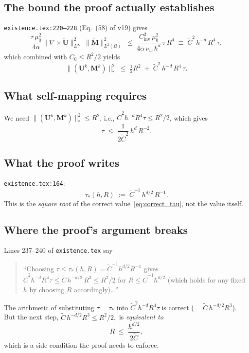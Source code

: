 \documentclass[11pt]{article}
\newcommand{\bM}{\mathbf{M}}
\newcommand{\bU}{\mathbf{U}}
\newcommand{\dt}{\tau}
\newcommand{\Lnorm}[1]{\|#1\|_{L^2(\Omega)}}
\newcommand{\Ctilde}{\widetilde{C}}
\begin{document}
\subsection*{The bound the proof actually establishes}

\texttt{existence.tex:220--228} (Eq.~(58) of v19) gives
\[
\frac{\dt\,\mu_{0}^{2}}{4\alpha}
  \|\nabla\!\times\!\widetilde{\bU}\|_{L^{\infty}}^{2}\,\Lnorm{\widetilde{\bM}}^{2}
\;\le\;
\frac{C_{\mathrm{inv}}^{2}\,\mu_{0}^{2}}{4\alpha\,\nu_{w}\,h^{d}}
\,\dt\,R^{4}
\;\equiv\;\Ctilde^{2}\,h^{-d}\,R^{4}\,\dt,
\]
which combined with $C_{0}\le R^{2}/2$ yields
\begin{equation}\label{eq:bound}
\bigl\|(\bU^{k},\bM^{k})\bigr\|_{*}^{2}
\;\le\;
\tfrac{1}{2}R^{2}\;+\;\Ctilde^{2}\,h^{-d}\,R^{4}\,\dt.
\end{equation}

\subsection*{What self-mapping requires}

We need $\|(\bU^{k},\bM^{k})\|_{*}^{2}\le R^{2}$, i.e.,
$\Ctilde^{2}h^{-d}R^{4}\dt\le R^{2}/2$, which gives
\begin{equation}\label{eq:correct_tau}
\boxed{\;\dt\;\le\;\frac{1}{2\Ctilde^{2}}\,h^{d}\,R^{-2}.\;}
\end{equation}

\subsection*{What the proof writes}

\texttt{existence.tex:164}:
\[
\dt_{*}(h,R)\;:=\;\Ctilde^{-1}\,h^{d/2}\,R^{-1}.
\]
This is the \emph{square root} of the correct value~\eqref{eq:correct_tau},
not the value itself.

\subsection*{Where the proof's argument breaks}

Lines 237--240 of \texttt{existence.tex} say
\begin{quote}
``Choosing $\dt\le\dt_{*}(h,R)=\Ctilde^{-1}h^{d/2}R^{-1}$ gives
$\Ctilde^{2}h^{-d}R^{4}\dt\le \Ctilde\,h^{-d/2}\,R^{3}\le R^{2}/2$
for $R\le \Ctilde^{-1}h^{d/2}$ (which holds for any fixed $h$ by
choosing $R$ accordingly)\dots''
\end{quote}

The arithmetic of substituting $\dt=\dt_{*}$ into
$\Ctilde^{2}h^{-d}R^{4}\dt$ is correct ($=\Ctilde\,h^{-d/2}R^{3}$).
But the next step,
\(
\Ctilde\,h^{-d/2}R^{3}\le R^{2}/2,
\)
is \emph{equivalent to}
\[
R\;\le\;\frac{h^{d/2}}{2\Ctilde},
\]
which is a side condition the proof needs to enforce.
\end{document}
